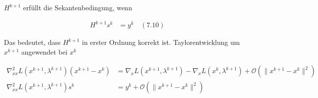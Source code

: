 
$H^{k+1}$ erfüllt die Sekantenbedingung, wenn

\begin{align*}
H^{k+1} s^k &= y^k \quad (7.10)
\end{align*}

Das bedeutet, dass $H^{k+1}$ in erster Ordnung korrekt ist. Taylorentwicklung um $x^{k+1}$ angewendet bei $x^k$

\begin{align*}
\nabla_{xx}^2 L(x^{k+1}, \lambda^{k+1}) (x^{k+1} - x^k) &= \nabla_x L(x^{k+1}, \lambda^{k+1}) - \nabla_x L(x^k, \lambda^{k+1}) + \mathcal O(\|x^{k+1} - x^k\|^2) \\
\nabla_{xx}^2 L(x^{k+1}, \lambda^{k+1}) s^k &= y^k + \mathcal O(\|x^{k+1}-x^k\|^2) \\
\end{align*}
















